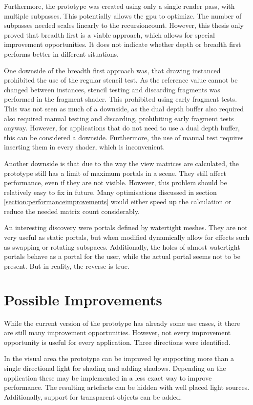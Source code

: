 Furthermore, the prototype was created using only a single render pass, with multiple subpasses. This potentially allows the \gls{gpu} to optimize. The number of subpasses needed scales linearly to the \gls{recursioncount}. However, this thesis only proved that breadth first is a viable approach, which allows for special improvement opportunities. It does not indicate whether depth or breadth first performs better in different situations.

One downside of the breadth first approach was, that drawing instanced prohibited the use of the regular stencil test. As the reference value cannot be changed between instances, stencil testing and discarding fragments was performed in the fragment shader. This prohibited using early fragment tests. This was not seen as much of a downside, as the dual depth buffer also required also required manual testing and discarding, prohibiting early fragment tests anyway. However, for applications that do not need to use a dual depth buffer, this can be considered a downside. Furthermore, the use of manual test requires inserting them in every shader, which is inconvenient.

Another downside is that due to the way the view matrices are calculated, the prototype still has a limit of maximum portals in a scene. They still affect performance, even if they are not visible. However, this problem should be relatively easy to fix in future. Many optimisations discussed in section \ref{section:performanceimprovements} would either speed up the calculation or reduce the needed matrix count considerably.

An interesting discovery were portals defined by watertight meshes. They are not very useful as static portals, but when modified dynamically allow for effects such as swapping or rotating subspaces. Additionally, the holes of almost watertight portals behave as a portal for the user, while the actual portal seems not to be present. But in reality, the reverse is true.


\section{Possible Improvements}

While the current version of the prototype has already some use cases, it there are still many improvement opportunities. However, not every improvement opportunity is useful for every application. Three directions were identified.

In the visual area the prototype can be improved by supporting more than a single directional light for shading and adding shadows. Depending on the application these may be implemented in a less exact way to improve performance. The resulting artefacts can be hidden with well placed light sources. Additionally, support for transparent objects can be added.

